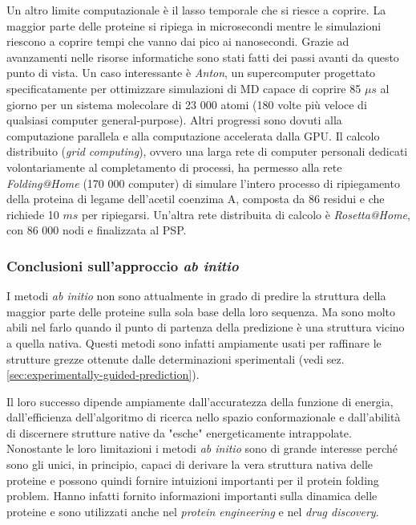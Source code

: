 {{\par Un altro limite computazionale è il lasso temporale che si riesce a coprire. La maggior parte delle proteine si ripiega in microsecondi mentre le simulazioni riescono a coprire tempi che vanno dai pico ai nanosecondi. Grazie ad avanzamenti nelle risorse informatiche sono stati fatti dei passi avanti da questo punto di vista. Un caso interessante è \textit{Anton}, un supercomputer progettato specificatamente per ottimizzare simulazioni di MD capace di coprire 85 $\mu s$ al giorno per un sistema molecolare di 23 000 atomi (180 volte più veloce di qualsiasi computer general-purpose). Altri progressi sono dovuti alla computazione parallela e alla computazione accelerata dalla GPU. Il calcolo distribuito (\textit{grid computing}), ovvero una larga rete di computer personali dedicati volontariamente al completamento di processi, ha permesso alla rete \textit{Folding@Home} (170 000 computer) di simulare l'intero processo di ripiegamento della proteina di legame dell'acetil coenzima A, composta da 86 residui e che richiede 10 $ms$ per ripiegarsi. Un'altra rete distribuita di calcolo è \textit{Rosetta@Home}, con 86 000 nodi e finalizzata al PSP. \\

\subsubsection{Conclusioni sull'approccio \textit{ab initio}}
I metodi \textit{ab initio} non sono attualmente in grado di predire la struttura della maggior parte delle proteine sulla sola base della loro sequenza. Ma sono molto abili nel farlo quando il punto di partenza della predizione è una struttura vicino a quella nativa. Questi metodi sono infatti ampiamente usati per raffinare le strutture grezze ottenute dalle determinazioni sperimentali (vedi sez. \ref{sec:experimentally-guided-prediction}). 

\par Il loro successo dipende ampiamente dall'accuratezza della funzione di energia, dall'efficienza dell'algoritmo di ricerca nello spazio conformazionale e dall'abilità di discernere strutture native da "esche" energeticamente intrappolate.
Nonostante le loro limitazioni i metodi \textit{ab initio} sono di grande interesse perché sono gli unici, in principio, capaci di derivare la vera struttura nativa delle proteine e possono quindi fornire intuizioni importanti per il protein folding problem. Hanno infatti fornito informazioni importanti sulla dinamica delle proteine e sono utilizzati anche nel \textit{protein engineering} e nel \textit{drug discovery}. 

}}
